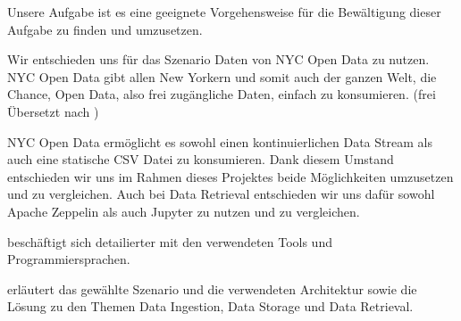 Unsere Aufgabe ist es eine geeignete Vorgehensweise für die Bewältigung dieser Aufgabe zu finden und umzusetzen.

Wir entschieden uns für das Szenario Daten von NYC Open Data zu nutzen. \glqq NYC Open Data gibt allen \glqq New Yorkern\grqq{} und somit auch der ganzen Welt, die Chance, Open Data, also frei zugängliche Daten,
einfach zu konsumieren.\grqq{} (frei Übersetzt nach \autocite{NYCOpenData})

NYC Open Data ermöglicht es sowohl einen kontinuierlichen Data Stream als auch eine statische \ac{CSV} Datei zu konsumieren.
Dank diesem Umstand entschieden wir uns im Rahmen dieses Projektes beide Möglichkeiten umzusetzen und zu vergleichen.
Auch bei Data Retrieval entschieden wir uns dafür sowohl Apache Zeppelin als auch Jupyter zu nutzen und zu vergleichen.

 beschäftigt sich detailierter mit den verwendeten Tools und Programmiersprachen.

 erläutert das gewählte Szenario und die verwendeten Architektur sowie die Lösung zu den Themen Data Ingestion, Data Storage und Data Retrieval.
